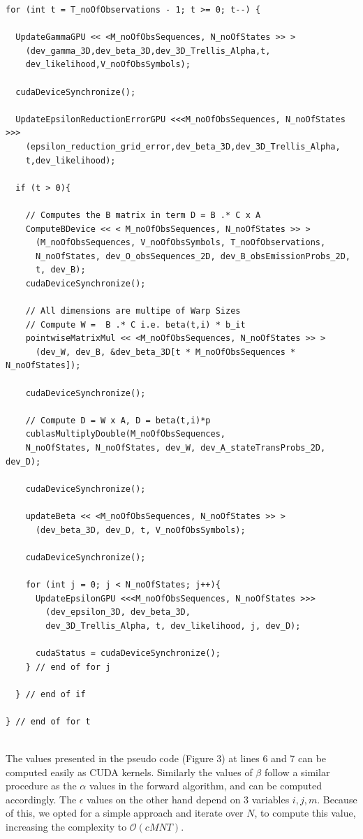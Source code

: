 \documentclass[english, paper=a4]{scrartcl}
\begin{document}
\begin{verbatim}
for (int t = T_noOfObservations - 1; t >= 0; t--) {
	
  UpdateGammaGPU << <M_noOfObsSequences, N_noOfStates >> >
    (dev_gamma_3D,dev_beta_3D,dev_3D_Trellis_Alpha,t,
    dev_likelihood,V_noOfObsSymbols);

  cudaDeviceSynchronize();

  UpdateEpsilonReductionErrorGPU <<<M_noOfObsSequences, N_noOfStates >>>
    (epsilon_reduction_grid_error,dev_beta_3D,dev_3D_Trellis_Alpha,
    t,dev_likelihood);
		
  if (t > 0){

    // Computes the B matrix in term D = B .* C x A
    ComputeBDevice << < M_noOfObsSequences, N_noOfStates >> >
      (M_noOfObsSequences, V_noOfObsSymbols, T_noOfObservations, 
      N_noOfStates, dev_O_obsSequences_2D, dev_B_obsEmissionProbs_2D, 
      t, dev_B);
    cudaDeviceSynchronize();

    // All dimensions are multipe of Warp Sizes
    // Compute W =  B .* C i.e. beta(t,i) * b_it
    pointwiseMatrixMul << <M_noOfObsSequences, N_noOfStates >> >
      (dev_W, dev_B, &dev_beta_3D[t * M_noOfObsSequences * N_noOfStates]);

    cudaDeviceSynchronize();

    // Compute D = W x A, D = beta(t,i)*p
    cublasMultiplyDouble(M_noOfObsSequences, 
    N_noOfStates, N_noOfStates, dev_W, dev_A_stateTransProbs_2D, dev_D);

    cudaDeviceSynchronize();

    updateBeta << <M_noOfObsSequences, N_noOfStates >> >
      (dev_beta_3D, dev_D, t, V_noOfObsSymbols);

    cudaDeviceSynchronize();

    for (int j = 0; j < N_noOfStates; j++){
      UpdateEpsilonGPU <<<M_noOfObsSequences, N_noOfStates >>>
        (dev_epsilon_3D, dev_beta_3D,
        dev_3D_Trellis_Alpha, t, dev_likelihood, j, dev_D);

      cudaStatus = cudaDeviceSynchronize();
    } // end of for j

  } // end of if
	
} // end of for t
	
\end{verbatim}
	
The values presented in the pseudo code (Figure 3) at lines 6 and 7 can be computed easily as CUDA kernels. Similarly the values of \(\beta\) follow a similar procedure as the \(\alpha\) values in the forward algorithm, and can be computed accordingly. The \(\epsilon\) values on the other hand depend on 3 variables \(i,j,m\). Because of this, we opted for a simple approach and iterate over \(N\), to compute this value, increasing the complexity to $\mathcal{O}(cMNT)$.
	
\end{document}
